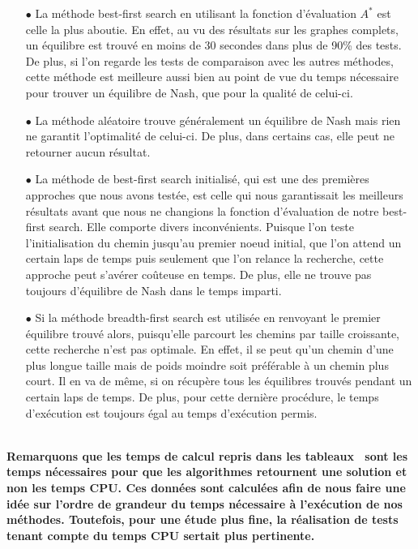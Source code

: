 \begin{itemize}
	\item[$\bullet$] La méthode best-first search en utilisant la fonction  d'évaluation $A^*$ est celle la plus aboutie. En effet, au vu des résultats sur les graphes complets, un équilibre est trouvé en moins de 30 secondes dans plus de 90\% des tests. De plus, si l'on regarde les tests de comparaison avec les autres méthodes, cette méthode est meilleure aussi bien au point de vue du temps nécessaire pour trouver un équilibre de Nash, que pour la qualité de celui-ci. 
	\item[$\bullet$] La méthode aléatoire trouve généralement un équilibre de Nash mais rien ne garantit l'optimalité de celui-ci. De plus, dans certains cas, elle peut ne retourner aucun résultat.	
	\item[$\bullet$] La méthode de best-first search initialisé, qui est une des premières approches que nous avons testée, est celle qui nous garantissait les meilleurs résultats avant que nous ne changions la fonction d'évaluation de notre best-first search. Elle comporte divers inconvénients. Puisque l'on teste l'initialisation du chemin jusqu'au premier noeud initial, que l'on attend un certain laps de temps puis seulement que l'on relance la recherche, cette approche peut s'avérer coûteuse en temps. De plus, elle ne trouve pas toujours d'équilibre de Nash dans le temps imparti.
	\item[$\bullet$] Si la méthode breadth-first search est utilisée en renvoyant le premier équilibre trouvé alors, puisqu'elle parcourt les chemins par taille croissante, cette recherche n'est pas optimale. En effet, il se peut qu'un chemin d'une plus longue taille mais de poids moindre soit préférable à un chemin plus court. Il en va de même, si on récupère tous les équilibres trouvés pendant un certain laps de temps. De plus, pour cette dernière procédure, le temps d'exécution est toujours égal au temps d'exécution permis.
\end{itemize}
$ $\\
\textbf{Remarquons que les temps de calcul repris dans les tableaux~ sont les temps nécessaires pour que les algorithmes retournent une solution et non les temps CPU. Ces données sont calculées afin de nous faire une idée sur l'ordre de grandeur du temps nécessaire à l'exécution de nos méthodes. Toutefois, pour une étude plus fine, la réalisation de tests tenant compte du temps CPU sertait plus pertinente.}



